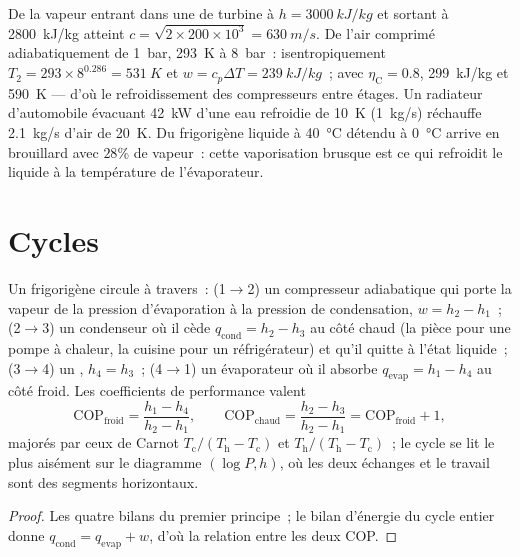 \begin{example}\label{ex:b2:open-systems:numbers}
De la vapeur entrant dans une  de turbine à $h = \qty{3000}{kJ/kg}$ et sortant
à \qty{2800}{kJ/kg} atteint $c = \sqrt{2 \times 200 \times 10^3} =
\qty{630}{m/s}$. De l'air comprimé adiabatiquement de \qty{1}{bar},
\qty{293}{K} à \qty{8}{bar}~: isentropiquement $T_2 = 293 \times 8^{0.286} =
\qty{531}{K}$ et $w = c_p\Delta T = \qty{239}{kJ/kg}$~; avec $\eta_{\text{C}} =
0.8$, \qty{299}{kJ/kg} et \qty{590}{K} --- d'où le refroidissement des compresseurs
entre étages. Un radiateur d'automobile évacuant \qty{42}{kW} d'une eau
refroidie de \qty{10}{K} (\qty{1}{kg/s}) réchauffe \qty{2.1}{kg/s} d'air de
\qty{20}{K}. Du frigorigène liquide à \qty{40}{\celsius} détendu à
\qty{0}{\celsius} arrive en brouillard avec $28\%$ de vapeur~: cette vaporisation
brusque est ce qui refroidit le liquide à la température de l'évaporateur.
\end{example}

\section{Cycles}

\begin{proposition}\label{prop:b2:open-systems:fridge}
Un frigorigène circule à travers~: (1$\to$2) un compresseur adiabatique
qui porte la vapeur de la pression d'évaporation à la pression de
condensation, $w = h_2 - h_1$~; (2$\to$3) un condenseur où il cède
$q_{\text{cond}} = h_2 - h_3$ au côté chaud (la pièce pour une pompe à chaleur, la
cuisine pour un réfrigérateur) et qu'il quitte à l'état liquide~; (3$\to$4) un , $h_4
= h_3$~; (4$\to$1) un évaporateur où il absorbe $q_{\text{evap}} = h_1 - h_4$
au côté froid. Les coefficients de performance valent
\[
\mathrm{COP}_{\text{froid}} = \frac{h_1 - h_4}{h_2 - h_1}, \qquad
\mathrm{COP}_{\text{chaud}} = \frac{h_2 - h_3}{h_2 - h_1} = \mathrm{COP}_{\text{froid}} + 1 ,
\]
majorés par ceux de Carnot $T_{\text{c}}/(T_{\text{h}} - T_{\text{c}})$ et
$T_{\text{h}}/(T_{\text{h}} - T_{\text{c}})$~; le cycle se lit le plus aisément sur
le diagramme $(\log P, h)$, où les deux échanges et le travail sont des
segments horizontaux.
\end{proposition}

\begin{proof}
Les quatre bilans du premier principe~; le bilan d'énergie du cycle entier
donne $q_{\text{cond}} = q_{\text{evap}} + w$, d'où la relation entre
les deux COP.
\end{proof}

